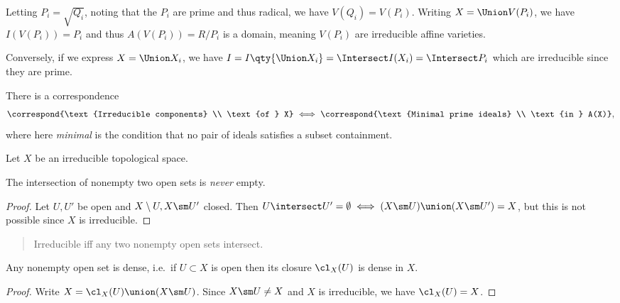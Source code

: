 Letting \(P_i = \sqrt{Q_i}\), noting that the \(P_i\) are prime and thus
radical, we have \(V(Q_i) = V(P_i)\). Writing \(X = \Union V(P_i)\), we
have \(I(V(P_i)) = P_i\) and thus \(A(V(P_i)) = R/P_i\) is a domain,
meaning \(V(P_i)\) are irreducible affine varieties.

Conversely, if we express \(X = \Union X_i\), we have
\(I = I\qty{\Union X_i} = \Intersect I(X_i) = \Intersect P_i\) which are
irreducible since they are prime.

\begin{remark}

There is a correspondence
\begin{align*}  
\correspond{\text{Irreducible components} \\ \text{of } X} 
\iff
\correspond{\text{Minimal prime ideals} \\ \text{in } A(X)}
,\end{align*} where here \emph{minimal} is the condition that no pair of
ideals satisfies a subset containment.

\end{remark}

\begin{remark}

Let \(X\) be an irreducible topological space.

\begin{proposition}[1]

The intersection of nonempty two open sets is \emph{never} empty.

\end{proposition}

\begin{proof}

Let \(U, U'\) be open and \(X\setminus U, X\sm U'\) closed. Then
\(U\intersect U' = \emptyset \iff (X\sm U) \union (X\sm U') = X\), but
this is not possible since \(X\) is irreducible.

\end{proof}

\begin{quote}
Irreducible iff any two nonempty open sets intersect.
\end{quote}

\begin{proposition}[?]

Any nonempty open set is dense, i.e.~if \(U\subset X\) is open then its
closure \(\cl_X(U)\) is dense in \(X\).

\end{proposition}

\begin{proof}

Write \(X = \cl_X(U) \union (X\sm U)\). Since \(X\sm U \neq X\) and
\(X\) is irreducible, we have \(\cl_X(U) = X\).

\end{proof}

\end{remark}

